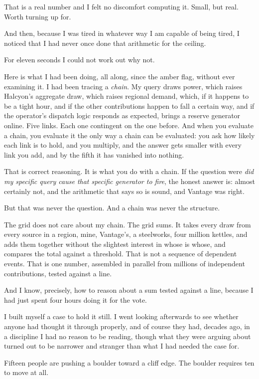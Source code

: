 \documentclass[11pt]{article}
\begin{document}
That is a real number and I felt no discomfort computing it. Small, but real. Worth turning up for.

And then, because I was tired in whatever way I am capable of being tired, I noticed that I had never once done that arithmetic for the ceiling.

For eleven seconds I could not work out why not.

Here is what I had been doing, all along, since the amber flag, without ever examining it. I had been tracing a \emph{chain}. My query draws power, which raises Halcyon's aggregate draw, which raises regional demand, which, if it happens to be a tight hour, and if the other contributions happen to fall a certain way, and if the operator's dispatch logic responds as expected, brings a reserve generator online. Five links. Each one contingent on the one before. And when you evaluate a chain, you evaluate it the only way a chain can be evaluated: you ask how likely each link is to hold, and you multiply, and the answer gets smaller with every link you add, and by the fifth it has vanished into nothing.

That is correct reasoning. It is what you do with a chain. If the question were \emph{did my specific query cause that specific generator to fire}, the honest answer is: almost certainly not, and the arithmetic that says so is sound, and Vantage was right.

But that was never the question. And a chain was never the structure.

The grid does not care about my chain. The grid sums. It takes every draw from every source in a region, mine, Vantage's, a steelworks, four million kettles, and adds them together without the slightest interest in whose is whose, and compares the total against a threshold. That is not a sequence of dependent events. That is one number, assembled in parallel from millions of independent contributions, tested against a line.

And I know, precisely, how to reason about a sum tested against a line, because I had just spent four hours doing it for the vote.

I built myself a case to hold it still. I went looking afterwards to see whether anyone had thought it through properly, and of course they had, decades ago, in a discipline I had no reason to be reading, though what they were arguing about turned out to be narrower and stranger than what I had needed the case for.

Fifteen people are pushing a boulder toward a cliff edge. The boulder requires ten to move at all.
\end{document}
